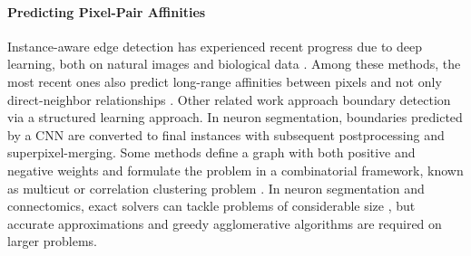 \paragraph{Predicting Pixel-Pair Affinities} 
Instance-aware edge detection has experienced recent progress due to deep learning, both on natural images and biological data \cite{Gao_2019_ICCV,liu2018affinity,lee2017superhuman,wolf2018mutex,schmidt2018cell,zeng2017deepem3d,parag2017anisotropic,bailoni2019generalized}. Among these methods, the most recent ones also predict long-range affinities between pixels and not only direct-neighbor relationships \cite{Gao_2019_ICCV,liu2018affinity,lee2017superhuman}.
Other related work \cite{funke2018large,turaga2009maximin} approach boundary detection via a structured learning approach.
In neuron segmentation, boundaries predicted by a CNN are converted to final instances with subsequent postprocessing and superpixel-merging.
Some methods define a graph with both positive and negative weights and formulate the problem in a combinatorial framework, known as multicut or correlation clustering problem \cite{chopra1991multiway}. 
In neuron segmentation and connectomics, exact solvers can tackle problems of considerable size \cite{andres2012globally}, but accurate approximations \cite{pape2017solving,yarkony2012fast} and greedy agglomerative algorithms \cite{levinkov2017comparative,wolf2019mutex,bailoni2019generalized} are required on larger problems.


